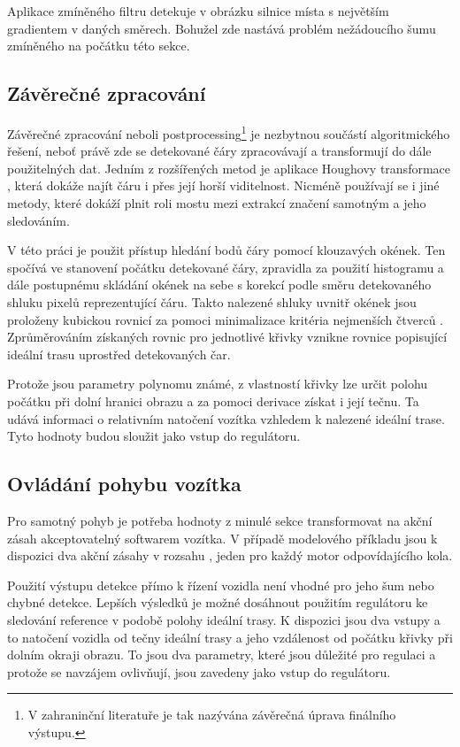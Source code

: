 \documentclass[czech, bc, kky, he, iso690numb]{fasthesis}
\begin{document}
                Aplikace zmíněného filtru detekuje v obrázku silnice místa s největším gradientem v daných směrech. Bohužel zde nastává problém nežádoucího šumu zmíněného na počátku této sekce.
            
            \newpage   
            \subsection{Závěrečné zpracování}\label{chap:01_postprocessing}
                Závěrečné zpracování neboli postprocessing\footnote{V zahraninční literatuře je tak nazývána závěrečná úprava finálního výstupu.} je nezbytnou součástí algoritmického řešení, neboť právě zde se detekované čáry zpracovávají a transformují do dále použitelných dat. Jedním z rozšířených metod je aplikace Houghovy transformace \cite{Hough_transform}, která dokáže najít čáru i přes její horší viditelnost. Nicméně používají se i jiné metody, které dokáží plnit roli mostu mezi extrakcí značení samotným a jeho sledováním.
                
                V této práci je použit přístup hledání bodů čáry pomocí klouzavých okének. Ten spočívá ve stanovení počátku detekované čáry, zpravidla za použití histogramu a dále postupnému skládání okének na sebe s korekcí podle směru detekovaného shluku pixelů reprezentující čáru. Takto nalezené shluky uvnitř okének jsou proloženy kubickou rovnicí za pomoci minimalizace kritéria nejmenších čtverců \cite{polyfit}. Zprůměrováním získaných rovnic pro jednotlivé křivky vznikne rovnice popisující ideální trasu uprostřed detekovaných čar.
                
                Protože jsou parametry polynomu známé, z vlastností křivky lze určit polohu počátku při dolní hranici obrazu a za pomoci derivace získat i její tečnu. Ta udává informaci o relativním natočení vozítka vzhledem k nalezené ideální trase. Tyto hodnoty budou sloužit jako vstup do regulátoru.
                
            \subsection{Ovládání pohybu vozítka}
            	Pro samotný pohyb je potřeba hodnoty z minulé sekce transformovat na akční zásah akceptovatelný softwarem vozítka. V případě modelového příkladu jsou k dispozici dva akční zásahy v rozsahu \(<-1,1>\), jeden pro každý motor odpovídajícího kola.
            	
                Použití výstupu detekce přímo k řízení vozidla není vhodné pro jeho šum nebo chybné detekce. Lepších výsledků je možné dosáhnout použitím regulátoru ke sledování reference v podobě polohy ideální trasy. K dispozici jsou dva vstupy a to natočení vozidla od tečny ideální trasy a jeho vzdálenost od počátku křivky při dolním okraji obrazu. To jsou dva parametry, které jsou důležité pro regulaci a protože se navzájem ovlivňují, jsou zavedeny jako vstup do regulátoru.
                
\end{document}
